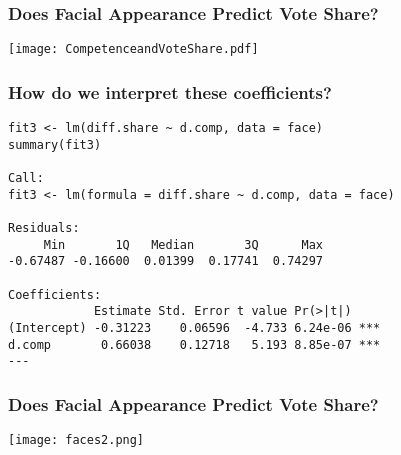 \documentclass[handout,compress]{beamer}
\begin{document}
\begin{frame}[fragile]
 \frametitle{Does Facial Appearance Predict Vote Share?}
\begin{center}
\texttt{[image: CompetenceandVoteShare.pdf]}
\end{center}
\end{frame}

\begin{frame}[fragile]
 \frametitle{How do we interpret these coefficients?}
\begin{small}
\begin{verbatim}
fit3 <- lm(diff.share ~ d.comp, data = face)
summary(fit3)

Call:
fit3 <- lm(formula = diff.share ~ d.comp, data = face)

Residuals:
     Min       1Q   Median       3Q      Max 
-0.67487 -0.16600  0.01399  0.17741  0.74297 

Coefficients:
            Estimate Std. Error t value Pr(>|t|)    
(Intercept) -0.31223    0.06596  -4.733 6.24e-06 ***
d.comp       0.66038    0.12718   5.193 8.85e-07 ***
---
\end{verbatim}
\end{small}
\end{frame}

\begin{frame}[fragile]
 \frametitle{Does Facial Appearance Predict Vote Share?}
\begin{center}
\texttt{[image: faces2.png]}
\end{center}
\end{frame}
\end{document}
